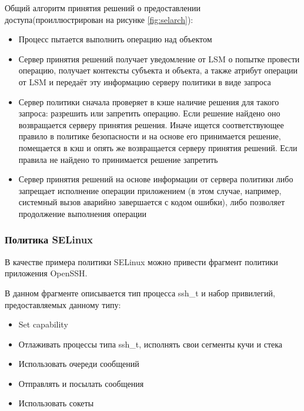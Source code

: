 Общий алгоритм принятия решений о предоставлении
доступа(проиллюстрирован на рисунке \ref{fig:selarch}): 
\begin{itemize}
\item Процесс пытается выполнить операцию над объектом 
\item Сервер принятия решений получает уведомление от LSM о попытке
    провести операцию, получает контексты субъекта и объекта, а также
    атрибут операции от LSM и передаёт эту информацию серверу политики в
    виде запроса 
\item Сервер политики сначала проверяет в кэше наличие решения для
    такого запроса: разрешить или запретить операцию. Если решение
    найдено оно возвращается серверу принятия решения. Иначе ищется
    соответствующее правило в политике безопасности и на основе его
    принимается решение, помещается в кэш и опять же возвращается
    серверу принятия решений. Если правила не найдено то принимается
    решение запретить 
\item Сервер принятия решений на основе информации от сервера политики
    либо запрещает исполнение операции приложением (в этом случае,
    например, системный вызов аварийно завершается с кодом ошибки), либо
    позволяет продолжение выполнения операции 
\end{itemize}

\subsubsection{Политика SELinux} 

В качестве примера политики SELinux можно привести
фрагмент политики приложения OpenSSH.


В данном фрагменте описывается тип процесса ssh\_t и
набор привилегий, предоставляемых данному типу:
\begin{itemize}
\item Set capability
\item Отлаживать процессы типа ssh\_t, исполнять свои сегменты
        кучи и стека
\item Использовать очереди сообщений
\item Отправлять и посылать сообщения
\item Использовать сокеты
\end{itemize}

